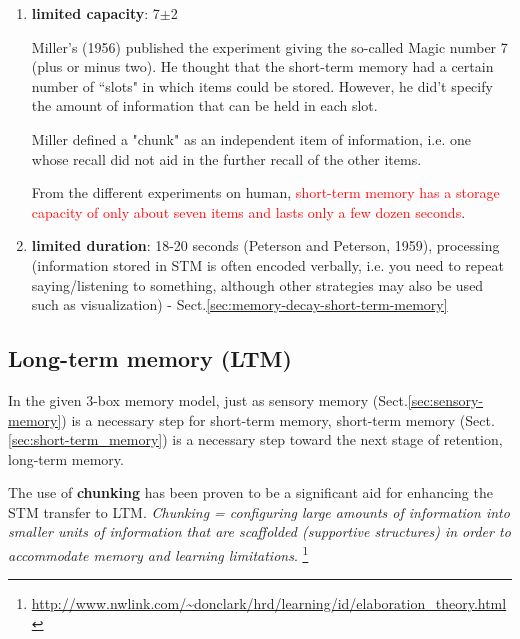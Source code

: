 \begin{enumerate}
  \item {\bf limited capacity}: 7$\pm$2

Miller's (1956) published the experiment giving the so-called Magic number 7
(plus or minus two). He  thought that the short-term memory had a certain number
of ``slots" in which items could be stored. However, he did't specify the amount
of information that can be held in each slot.

Miller defined a "chunk" as an independent item of information, i.e. 
one whose recall did not aid in the further recall of the other items. 

From the different experiments on human, \textcolor{red}{short-term memory has a
storage capacity of only about seven items and lasts only a few dozen seconds}.

  \item {\bf limited duration}: 18-20 seconds (Peterson and Peterson, 1959),
  processing (information stored in STM is often encoded verbally, i.e. you need
  to repeat saying/listening to something, although other strategies may also
  be used such as visualization) - Sect.\ref{sec:memory-decay-short-term-memory}


 
\end{enumerate}


\subsection{Long-term memory (LTM)}
\label{sec:long-term_memory}

In the given 3-box memory model, just as sensory memory
(Sect.\ref{sec:sensory-memory}) is a necessary step for short-term memory,
short-term memory (Sect.\ref{sec:short-term_memory}) is a necessary step toward
the next stage of retention, long-term memory.

The use of {\bf chunking} has been proven to be a significant aid for enhancing
the STM transfer to LTM. {\small {\it Chunking = configuring large amounts of
information into smaller units of information that are scaffolded (supportive
structures) in order to accommodate memory and learning limitations}}.
\footnote{\url{http://www.nwlink.com/~donclark/hrd/learning/id/elaboration_theory.html}}

